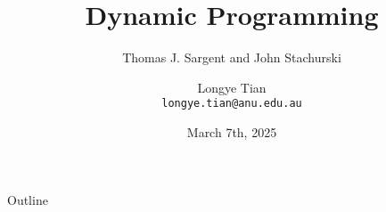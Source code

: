 \documentclass[aspectratio=169]{beamer} %
\title[DP2]{Dynamic Programming}
\subtitle{Thomas J. Sargent and John Stachurski}
\author[Longye]{Longye Tian \\ \texttt{longye.tian@anu.edu.au}}
\institute[ANU]{Australian National University\\ School of Economics}
\date{March 7th, 2025}
\begin{document}
\begin{frame}
  \titlepage
\end{frame}

\begin{frame}{Outline}
  \tableofcontents
\end{frame}






\end{document}
